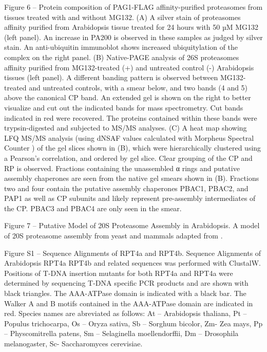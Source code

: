 Figure 6 – Protein composition of PAG1-FLAG affinity-purified proteasomes from tissues treated with and without MG132. (A) A silver stain of proteasomes affinity purified from Arabidopsis tissue treated for 24 hours with 50 µM MG132 (left panel). An increase in PA200 is observed in these samples as judged by silver stain. An anti-ubiquitin immunoblot shows increased ubiquitylation of the complex on the right panel. (B) Native-PAGE analysis of 26S proteasomes affinity purified from MG132-treated (+) and untreated control (-) Arabidopsis tissues (left panel). A different banding pattern is observed between MG132-treated and untreated controls, with a smear below, and two bands (4 and 5) above the canonical CP band. An extended gel is shown on the right to better visualize and cut out the indicated bands for mass spectrometry. Cut bands indicated in red were recovered. The proteins contained within these bands were trypsin-digested and subjected to MS/MS analyses. (C) A heat map showing LFQ MS/MS analysis (using dNSAF values calculated with Morpheus Spectral Counter \citep{gemperline16}) of the gel slices shown in (B), which were hierarchically clustered using a Pearson’s correlation, and ordered by gel slice. Clear grouping of the CP and RP is observed. Fractions containing the unassembled α rings and putative assembly chaperones are seen from the native gel smears shown in (B). Fractions two and four contain the putative assembly chaperones PBAC1, PBAC2, and PAP1 as well as CP subunits and likely represent pre-assembly intermediates of the CP. PBAC3 and PBAC4 are only seen in the smear.

Figure 7 – Putative Model of 20S Proteasome Assembly in Arabidopsis. A model of 20S proteasome assembly from yeast and mammals adapted from \citep{murata09}.

Figure S1 – Sequence Alignments of RPT4a and RPT4b. Sequence Alignments of Arabidopsis RPT4a RPT4b and related sequences was performed with ClustalW. Positions of T-DNA insertion mutants for both RPT4a and RPT4a were determined by sequencing T-DNA specific PCR products and are shown with black triangles. The AAA-ATPase domain is indicated with a black bar. The Walker A and B motifs contained in the AAA-ATPase domain are indicated in red. Species names are abreviated as follows: At – Arabidopsis thaliana, Pt – Populus trichocarpa, Os – Oryza sativa, Sb – Sorghum bicolor, Zm- Zea mays, Pp – Physcomitrella patens, Sm – Selaginella moellendorffii, Dm – Drosophila melanogaster, Sc- Saccharomyces cerevisiae.

